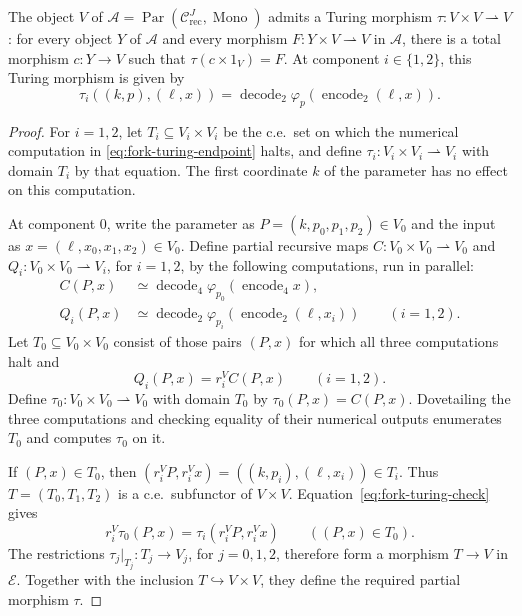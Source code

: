 \begin{theorem}\label{thm:fork-turing}
The object $V$ of
$\mathcal A=\operatorname{Par}(\mathcal C_{\mathrm{rec}}^J,
\operatorname{Mono})$ admits a Turing morphism
$\tau:V\times V\rightharpoonup V$: for every object $Y$ of
$\mathcal A$ and every morphism $F:Y\times V\rightharpoonup V$
in $\mathcal A$, there is a total morphism
$c:Y\to V$ such that $\tau(c\times1_V)=F$.
At component $i\in\{1,2\}$, this Turing morphism is given by
\begin{equation}\label{eq:fork-turing-endpoint}
 \tau_i((k,p),(\ell,x))
 =\operatorname{decode}_2
     \varphi_p(\operatorname{encode}_2(\ell,x)).
\end{equation}
\end{theorem}

\begin{proof}
For $i=1,2$, let $T_i\subseteq V_i\times V_i$ be the c.e.\ set
on which the numerical computation in
\eqref{eq:fork-turing-endpoint} halts, and define
$\tau_i:V_i\times V_i\rightharpoonup V_i$ with domain $T_i$
by that equation. The first coordinate $k$
of the parameter has no effect on this computation.

At component $0$, write the parameter as
$P=(k,p_0,p_1,p_2)\in V_0$ and the input as
$x=(\ell,x_0,x_1,x_2)\in V_0$.
Define partial recursive maps
$C:V_0\times V_0\rightharpoonup V_0$ and
$Q_i:V_0\times V_0\rightharpoonup V_i$, for $i=1,2$,
by the following computations, run in parallel:
\begin{align*}
 C(P,x)&\simeq
   \operatorname{decode}_4
      \varphi_{p_0}(\operatorname{encode}_4 x),\\
 Q_i(P,x)&\simeq
   \operatorname{decode}_2
      \varphi_{p_i}(\operatorname{encode}_2(\ell,x_i))
      \qquad(i=1,2).
\end{align*}
Let $T_0\subseteq V_0\times V_0$ consist of those pairs $(P,x)$
for which all three computations halt and
\begin{equation}\label{eq:fork-turing-check}
 Q_i(P,x)=r_i^V C(P,x)\qquad(i=1,2).
\end{equation}
Define $\tau_0:V_0\times V_0\rightharpoonup V_0$ with domain
$T_0$ by $\tau_0(P,x)=C(P,x)$.
Dovetailing the three computations and checking equality of their
numerical outputs enumerates $T_0$ and computes $\tau_0$ on it.

If $(P,x)\in T_0$, then
$(r_i^V P,r_i^V x)=((k,p_i),(\ell,x_i))\in T_i$.
Thus $T=(T_0,T_1,T_2)$ is a c.e.\ subfunctor of $V\times V$.
Equation~\eqref{eq:fork-turing-check} gives
\[
 r_i^V\tau_0(P,x)
   =\tau_i(r_i^V P,r_i^V x)
 \qquad((P,x)\in T_0).
\]
The restrictions $\tau_j|_{T_j}:T_j\to V_j$, for $j=0,1,2$,
therefore form a morphism $T\to V$ in $\mathcal E$.
Together with the inclusion $T\hookrightarrow V\times V$,
they define the required partial morphism $\tau$.


\end{proof}
